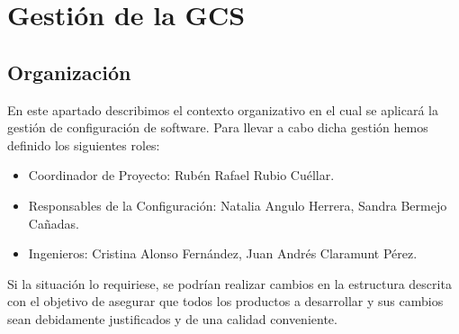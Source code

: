 \documentclass[11pt, a4paper, twoside, titlepage]{article}
\begin{document}
	\section{Gestión de la GCS} %
		\subsection{Organización}
			En este apartado describimos el contexto organizativo en el cual se aplicará la gestión de configuración de software. Para llevar a cabo dicha gestión hemos definido los siguientes roles:

			\begin{itemize}
				\item Coordinador de Proyecto: Rubén Rafael Rubio Cuéllar.
				\item Responsables de la Configuración: Natalia Angulo Herrera, Sandra Bermejo Cañadas.
				\item Ingenieros: Cristina Alonso Fernández, Juan Andrés Claramunt Pérez.
			\end{itemize}

			Si la situación lo requiriese, se podrían realizar cambios en la estructura descrita con el objetivo de asegurar que todos los productos a desarrollar y sus cambios sean debidamente justificados y de una calidad conveniente.
\end{document}
